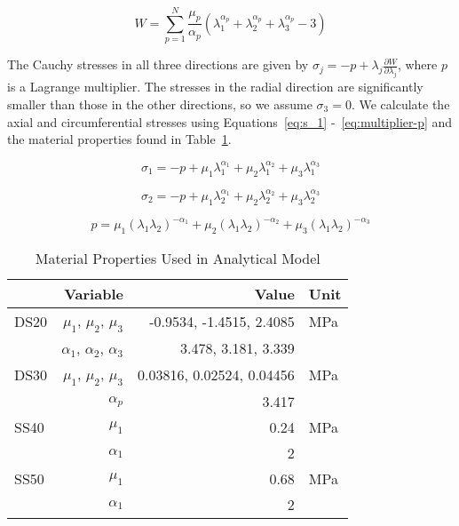 \begin{equation}
    W=\sum_{p=1}^N \frac{\mu_p}{\alpha_p}(\lambda_1^{\alpha_p}+\lambda_2^{\alpha_p}+\lambda_3^{\alpha_p}-3)
    \label{eq:strain-ogden}
\end{equation}

\clearpage
The Cauchy stresses in all three directions are given by $\sigma_j=-p+\lambda_j\frac{\partial W}{\partial\lambda_j}$, where $p$ is a Lagrange multiplier. The stresses in the radial direction are significantly smaller than those in the other directions, so we assume $\sigma_3=0$. We calculate the axial and circumferential stresses using Equations~\ref{eq:s_1} -~\ref{eq:multiplier-p} and the material properties found in Table~\ref{table}. 

\begin{equation}
    \sigma_1 =-p+\mu_1\lambda_1^{\alpha_1}+\mu_2\lambda_1^{\alpha_2}+\mu_3\lambda_1^{\alpha_3}
    \label{eq:s_1}
\end{equation}

\begin{equation}
    \sigma_2 =-p+\mu_1\lambda_2^{\alpha_1}+\mu_2\lambda_2^{\alpha_2}+\mu_3\lambda_2^{\alpha_3}
    \label{eq:s_2}
\end{equation}

\begin{equation}
    p=\mu_1(\lambda_1\lambda_2)^{-\alpha_1}+\mu_2(\lambda_1\lambda_2)^{-\alpha_2}+\mu_3(\lambda_1\lambda_2)^{-\alpha_3}
    \label{eq:multiplier-p}
\end{equation}

\begin{table}[]
\caption{Material Properties Used in Analytical Model}
\label{table}
\centering
\begin{tabular}{l r r l}
\hline
{} & \bfseries Variable & \bfseries Value & \bfseries Unit \\
\hline\hline
DS20 \cite{marechal_toward_2021} & $\mu_1$, $\mu_2$, $\mu_3$ & -0.9534, -1.4515, 2.4085 & MPa\\
{} & $\alpha_1$, $\alpha_2$, $\alpha_3$ & 3.478, 3.181, 3.339 & {}\\
\hline
DS30 \cite{marechal_toward_2021} & $\mu_1$, $\mu_2$, $\mu_3$ & 0.03816, 0.02524, 0.04456 & MPa\\
{} & $\alpha_p$ & 3.417 & {}\\
\hline
SS40 \cite{pagoli_review_2022} & $\mu_1$ & 0.24 & MPa\\
{} & $\alpha_1$ & 2 & {}\\
\hline
SS50 \cite{xavier_finite_2021} & $\mu_1$ & 0.68 & MPa\\
{} & $\alpha_1$ & 2 & {}\\
\end{tabular}
\label{table}
\end{table}

